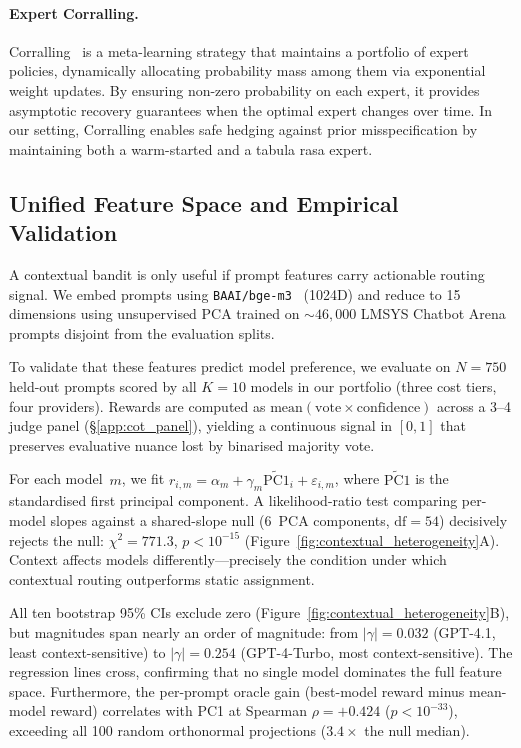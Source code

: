 \paragraph{Expert Corralling.}
Corralling~\cite{agarwal2017corralling} is a meta-learning strategy that maintains a portfolio of expert policies, dynamically allocating probability mass among them via exponential weight updates. By ensuring non-zero probability on each expert, it provides asymptotic recovery guarantees when the optimal expert changes over time. In our setting, Corralling enables safe hedging against prior misspecification by maintaining both a warm-started and a tabula rasa expert.

\subsection{Unified Feature Space and Empirical Validation}
\label{sec:motivation}

A contextual bandit is only useful if prompt features carry actionable routing signal.
We embed prompts using \texttt{BAAI/bge-m3}~\cite{chen2024bge} (1024D) and reduce to 15 dimensions using unsupervised PCA trained on ${\sim}46{,}000$ LMSYS Chatbot Arena prompts disjoint from the evaluation splits.

To validate that these features predict model preference, we evaluate on $N{=}750$ held-out prompts scored by all $K{=}10$ models in our portfolio (three cost tiers, four providers).
Rewards are computed as $\text{mean}(\text{vote} \times \text{confidence})$ across a 3--4 judge panel (\S\ref{app:cot_panel}), yielding a continuous signal in $[0,1]$ that preserves evaluative nuance lost by binarised majority vote.

For each model~$m$, we fit $r_{i,m} = \alpha_m + \gamma_m \widetilde{\text{PC1}}_i + \varepsilon_{i,m}$, where $\widetilde{\text{PC1}}$ is the standardised first principal component.
A likelihood-ratio test comparing per-model slopes against a shared-slope null (6~PCA components, $\text{df}{=}54$) decisively rejects the null: $\chi^2 = 771.3$, $p < 10^{-15}$ (Figure~\ref{fig:contextual_heterogeneity}A).
Context affects models differently---precisely the condition under which contextual routing outperforms static assignment.

All ten bootstrap 95\% CIs exclude zero (Figure~\ref{fig:contextual_heterogeneity}B), but magnitudes span nearly an order of magnitude: from $|\gamma| = 0.032$ (GPT-4.1, least context-sensitive) to $|\gamma| = 0.254$ (GPT-4-Turbo, most context-sensitive).
The regression lines cross, confirming that no single model dominates the full feature space.
Furthermore, the per-prompt oracle gain (best-model reward minus mean-model reward) correlates with PC1 at Spearman $\rho = {+}0.424$ ($p < 10^{-33}$), exceeding all 100 random orthonormal projections ($3.4\times$ the null median).

